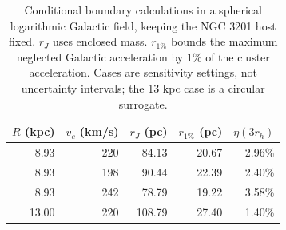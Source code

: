 \begin{table}[t]
\caption{Conditional boundary calculations in a spherical logarithmic Galactic field, keeping the NGC 3201 host fixed. $r_J$ uses enclosed mass. $r_{1\%}$ bounds the maximum neglected Galactic acceleration by 1\% of the cluster acceleration. Cases are sensitivity settings, not uncertainty intervals; the 13 kpc case is a circular surrogate.}\label{tab:outer-boundary}
\centering\begin{tabular}{rrrrr}
\toprule
$R$ (kpc) & $v_c$ (km/s) & $r_J$ (pc) & $r_{1\%}$ (pc) & $\eta(3r_h)$ \\
\midrule
8.93 & 220 & 84.13 & 20.67 & 2.96\%  \\
8.93 & 198 & 90.44 & 22.39 & 2.40\%  \\
8.93 & 242 & 78.79 & 19.22 & 3.58\%  \\
13.00 & 220 & 108.79 & 27.40 & 1.40\%  \\
\bottomrule
\end{tabular}
\end{table}
